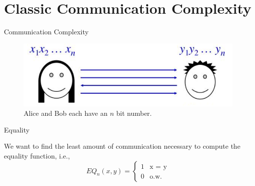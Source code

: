 \section{Classic Communication Complexity}
    
    \begin{frame}{Communication Complexity}
        \begin{figure}
            \centering
            \includegraphics[width=\linewidth]{pics/1.png}
            \caption{Alice and Bob each have an $n$ bit number.}
            \label{fig:my_label}
        \end{figure}
        
        
        \begin{itemize}

        	
        \end{itemize}
    \end{frame}
    
    \begin{frame}{Equality}
        \begin{example}
        We want to find the least amount of communication necessary to compute the equality function, i.e., 
        \begin{equation*}
            EQ_{n}(x,y) =
    \begin{cases}
        1 & \text{x = y}\\
        0 & \text{o.w.}
    \end{cases}
        \end{equation*}
        \end{example}
    
    
    \end{frame}

